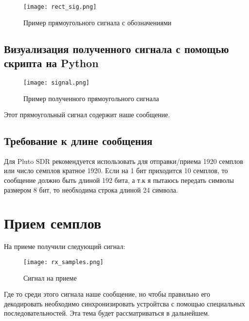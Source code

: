 \begin{figure}[H]
    \centering
    \texttt{[image: rect\_sig.png]}
    \caption{Пример прямоугольного сигнала с обозначениями}
\end{figure}

\subsection*{\textbf{Визуализация полученного сигнала с помощью скрипта на Python}}

\begin{figure}[H]
    \centering
    \texttt{[image: signal.png]}
    \caption{Пример полученного прямоугольного сигнала}
\end{figure}

Этот прямоугольный сигнал содержит наше сообщение.

\subsection*{\textbf{Требование к длине сообщения}}

Для Pluto SDR рекомендуется использовать для отправки/приема 1920 семплов или число семплов кратное 1920. Если на 1 бит приходится 10 семплов, то сообщение должно
быть длиной 192 бита, а т.к я пытаюсь передать символы размером 8 бит, то необходима строка длиной 24 символа.


\section*{\textbf{Прием семплов}}

На приеме получили следующий сигнал:

\begin{figure}[H]
    \centering
    \texttt{[image: rx\_samples.png]}
    \caption{Сигнал на приеме}
\end{figure}

Где то среди этого сигнала наше сообщение, но чтобы правильно его декодировать необходимо синхронизировать устройтсва с помощью специальных последовательностей. Эта тема
будет рассматриваться в дальнейшем.

\endinput
